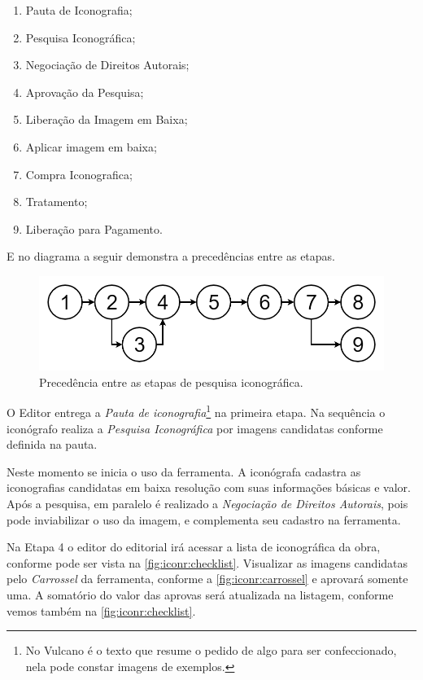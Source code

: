 \documentclass[
  12pt,				%
  openany,
  oneside,
  a4paper,			%
  english,			%
  brazil
]{article}
\numberwithin{figure}{section}
\numberwithin{table}{section}
\begin{document}
\vspace{-10mm}
\begin{singlespace}
	\begin{enumerate}
	\item Pauta de Iconografia;
	\item Pesquisa Iconográfica;
	\item Negociação de Direitos Autorais;
	\item Aprovação da Pesquisa;
	\item Liberação da Imagem em Baixa;
	\item Aplicar imagem em baixa;
	\item Compra Iconografica;
	\item Tratamento;
	\item Liberação para Pagamento.
	\end{enumerate}
\end{singlespace}
\vspace{-5mm}

E no diagrama a seguir demonstra a precedências entre as etapas.

\begin{figure}[H]
	\centering
	\includegraphics[width=0.7\linewidth]{Iconr_etapas}
	\vspace{-5mm}
	\caption{Precedência entre as etapas de pesquisa iconográfica.}
	\label{fig:iconr:etapas}
\end{figure}

O Editor entrega a \textit{Pauta de iconografia}\footnote{No Vulcano é o texto que resume o pedido de algo para ser confeccionado, nela pode constar imagens de exemplos.} na primeira etapa. Na sequência o iconógrafo realiza a \textit{Pesquisa Iconográfica} por imagens candidatas conforme definida na pauta.

Neste momento se inicia o uso da ferramenta. A iconógrafa cadastra as iconografias candidatas em baixa resolução com suas informações básicas e valor. Após a pesquisa, em paralelo é realizado a \textit{Negociação de Direitos Autorais}, pois pode inviabilizar o uso da imagem, e complementa seu cadastro na ferramenta. 

Na Etapa 4 o editor do editorial irá acessar a lista de iconográfica da obra, conforme pode ser vista na \autoref{fig:iconr:checklist}. Visualizar as imagens candidatas pelo \textit{Carrossel} da ferramenta, conforme a \autoref{fig:iconr:carrossel} e aprovará somente uma. A somatório do valor das aprovas será atualizada na listagem, conforme vemos também na \autoref{fig:iconr:checklist}.
\end{document}
